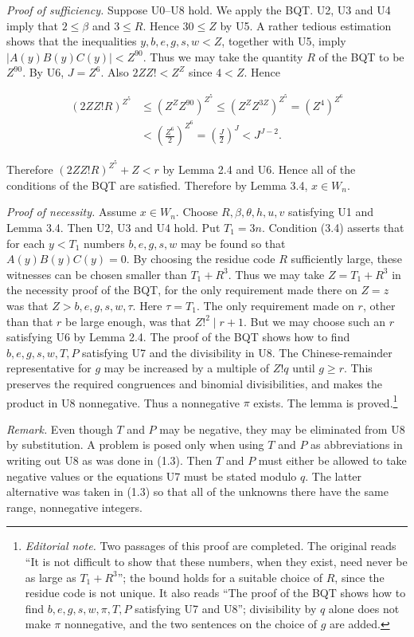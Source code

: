 \documentclass[11pt,a4paper]{article}
\newcommand{\ednote}[1]{\footnote{\textit{Editorial note.} #1}}
\begin{document}
\noindent\textit{Proof of sufficiency.} Suppose U0--U8 hold. We apply the BQT. U2, U3 and U4 imply that $2 \leq \beta$ and $3 \leq R$. Hence $30 \leq Z$ by U5. A rather tedious estimation shows that the inequalities $y, b, e, g, s, w<Z$, together with U5, imply $|A(y) B(y) C(y)|<Z^{90}$. Thus we may take the quantity $R$ of the BQT to be $Z^{90}$. By U6, $J=Z^{6}$. Also $2 Z Z!<Z^{Z}$ since $4<Z$. Hence

\[
\begin{aligned}
(2ZZ!R)^{Z^5}
&\leq (Z^Z Z^{90})^{Z^5}\leq (Z^Z Z^{3Z})^{Z^5}=(Z^4)^{Z^6}\\
&<\left(\frac{Z^6}{2}\right)^{Z^6}=\left(\frac J2\right)^J<J^{J-2}.
\end{aligned}
\]

Therefore $(2 Z Z!R)^{Z^{5}}+Z<r$ by Lemma 2.4 and U6. Hence all of the conditions of the BQT are satisfied. Therefore by Lemma 3.4, $x \in W_{n}$.

\noindent\textit{Proof of necessity.} Assume $x \in W_{n}$. Choose $R, \beta, \theta, h, u, v$ satisfying U1 and Lemma 3.4. Then U2, U3 and U4 hold. Put $T_{1}=3 n$. Condition (3.4) asserts that for each $y<T_{1}$ numbers $b, e, g, s, w$ may be found so that $A(y)B(y)C(y)=0$. By choosing the residue code $R$ sufficiently large, these witnesses can be chosen smaller than $T_1+R^3$. Thus we may take $Z=T_{1}+R^{3}$ in the necessity proof of the BQT, for the only requirement made there on $Z=z$ was that $Z>b, e, g, s, w, \tau$. Here $\tau=T_{1}$. The only requirement made on $r$, other than that $r$ be large enough, was that $Z!^{2} \mid r+1$. But we may choose such an $r$ satisfying U6 by Lemma 2.4. The proof of the BQT shows how to find $b,e,g,s,w,T,P$ satisfying U7 and the divisibility in U8. The Chinese-remainder representative for $g$ may be increased by a multiple of $Z!q$ until $g\geq r$. This preserves the required congruences and binomial divisibilities, and makes the product in U8 nonnegative. Thus a nonnegative $\pi$ exists. The lemma is proved.\ednote{Two passages of this proof are completed. The original reads ``It is not difficult to show that these numbers, when they exist, need never be as large as $T_1+R^3$''; the bound holds for a suitable choice of $R$, since the residue code is not unique. It also reads ``The proof of the BQT shows how to find $b,e,g,s,w,\pi,T,P$ satisfying U7 and U8''; divisibility by $q$ alone does not make $\pi$ nonnegative, and the two sentences on the choice of $g$ are added.}

\noindent\textit{Remark.} Even though $T$ and $P$ may be negative, they may be eliminated from U8 by substitution. A problem is posed only when using $T$ and $P$ as abbreviations in writing out U8 as was done in (1.3). Then $T$ and $P$ must either be allowed to take negative values or the equations U7 must be stated modulo $q$. The latter alternative was taken in (1.3) so that all of the unknowns there have the same range, nonnegative integers.
\end{document}
